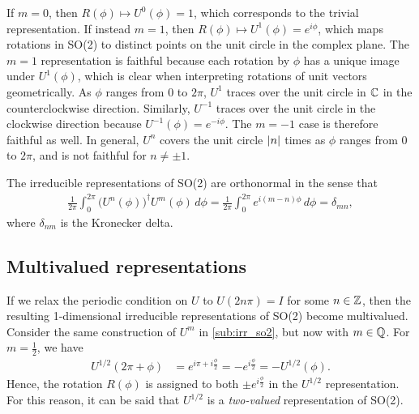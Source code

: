 If $m=0$, then $R(\phi)\mapsto U^0(\phi) = 1$, which corresponds to the trivial representation. If instead $m=1$, then $R(\phi)\mapsto U^1(\phi) = e^{i\phi}$, which maps rotations in SO(2) to distinct points on the unit circle in the complex plane. The $m=1$ representation is faithful because each rotation by $\phi$ has a unique image under $U^1(\phi)$, which is clear when interpreting rotations of unit vectors geometrically. As $\phi$ ranges from 0 to $2\pi$, $U^1$ traces over the unit circle in $\mathbb{C}$ in the counterclockwise direction. Similarly, $U^{-1}$ traces over the unit circle in the clockwise direction because $U^{-1}(\phi)=e^{-i\phi}$. The $m=-1$ case is therefore faithful as well. In general, $U^n$ covers the unit circle $\left|n\right|$ times as $\phi$ ranges from 0 to $2\pi$, and is not faithful for $n\neq\pm1$.

The irreducible representations of SO(2) are orthonormal in the sense that
\begin{align*}
    \frac{1}{2\pi}\int_{0}^{2\pi}{\bigl(U^n(\phi)\bigr)}^\dagger U^m(\phi) \,d\phi = \frac{1}{2\pi}\int_{0}^{2\pi} e^{i(m-n)\phi} \,d\phi = \delta_{mn},
\end{align*}
where $\delta_{nm}$ is the Kronecker delta.

\subsection{Multivalued representations}\label{sub:multi_so2}
If we relax the periodic condition on $U$ to $U(2n\pi) = I$ for some $n\in\mathbb{Z}$, then the resulting 1-dimensional irreducible representations of SO(2) become multivalued. Consider the same construction of $U^m$ in \cref{sub:irr_so2}, but now with $m\in\mathbb{Q}$. For $m=\frac{1}{2}$, we have
\begin{align*}
    U^{1/2}(2\pi + \phi) &= e^{i\pi + i\frac{\phi}{2}} = -e^{i\frac{\phi}{2}} = -U^{1/2}(\phi).
\end{align*}
Hence, the rotation $R(\phi)$ is assigned to both $\pm e^{i\frac{\phi}{2}}$ in the $U^{1/2}$ representation. For this reason, it can be said that $U^{1/2}$ is a \textit{two-valued} representation of SO(2).


